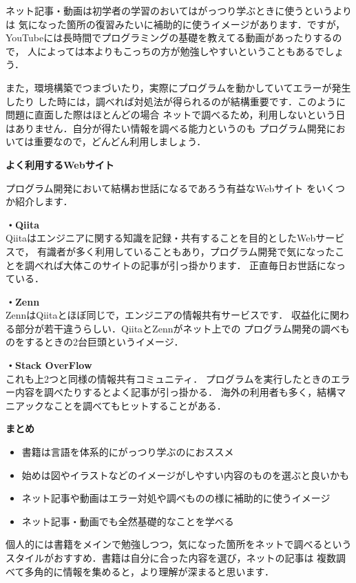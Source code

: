 \documentclass[autodetect-engine,dvi=dvipdfmx,ja=standard,a4j,12pt]{bxjsarticle}
\begin{document}
ネット記事・動画は初学者の学習のおいてはがっつり学ぶときに使うというよりは
気になった箇所の復習みたいに補助的に使うイメージがあります．ですが，
YouTubeには長時間でプログラミングの基礎を教えてる動画があったりするので，
人によっては本よりもこっちの方が勉強しやすいということもあるでしょう．

また，環境構築でつまづいたり，実際にプログラムを動かしていてエラーが発生したり
した時には，調べれば対処法が得られるのが結構重要です．このように問題に直面した際はほとんどの場合
ネットで調べるため，利用しないという日はありません．自分が得たい情報を調べる能力というのも
プログラム開発においては重要なので，どんどん利用しましょう．

\clearpage

\begin{center}
    {\Large \textbf{よく利用するWebサイト}} \\
\end{center}
プログラム開発において結構お世話になるであろう有益なWebサイト
をいくつか紹介します．

\begin{boxnote}
{\large \textbf{・Qiita}} \\
Qiitaはエンジニアに関する知識を記録・共有することを目的としたWebサービスで，
有識者が多く利用していることもあり，プログラム開発で気になったことを調べれば大体このサイトの記事が引っ掛かります．
正直毎日お世話になっている．

{\large \textbf{・Zenn}} \\
ZennはQiitaとほぼ同じで，エンジニアの情報共有サービスです．
収益化に関わる部分が若干違うらしい．QiitaとZennがネット上での
プログラム開発の調べものをするときの2台巨頭というイメージ．

{\large \textbf{・Stack OverFlow}} \\
これも上2つと同様の情報共有コミュニティ．
プログラムを実行したときのエラー内容を調べたりするとよく記事が引っ掛かる．
海外の利用者も多く，結構マニアックなことを調べてもヒットすることがある．
\end{boxnote}

\begin{center}
    {\Large \textbf{まとめ}}
\end{center}
\begin{itemize}
    \item 書籍は言語を体系的にがっつり学ぶのにおススメ
    \item 始めは図やイラストなどのイメージがしやすい内容のものを選ぶと良いかも
    \item ネット記事や動画はエラー対処や調べものの様に補助的に使うイメージ
    \item ネット記事・動画でも全然基礎的なことを学べる
\end{itemize}
個人的には書籍をメインで勉強しつつ，気になった箇所をネットで調べるという
スタイルがおすすめ．書籍は自分に合った内容を選び，ネットの記事は
複数調べて多角的に情報を集めると，より理解が深まると思います．
\end{document}
